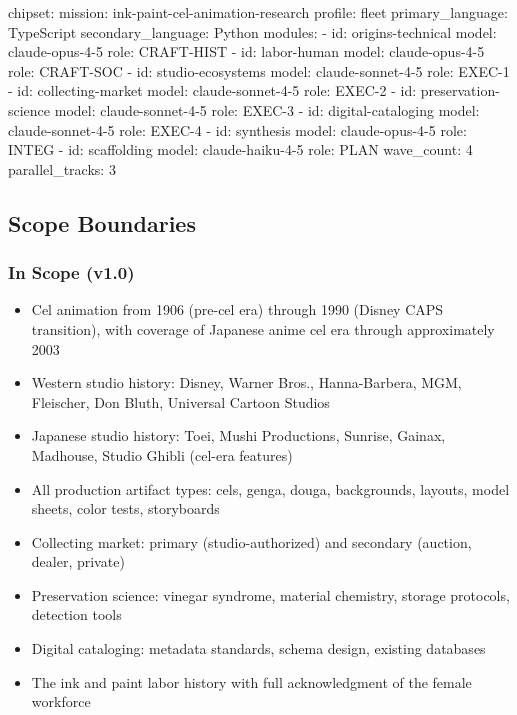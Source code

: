 \documentclass[11pt,letterpaper]{article}
\begin{document}
\begin{asciibox}
chipset:
  mission: ink-paint-cel-animation-research
  profile: fleet
  primary_language: TypeScript
  secondary_language: Python
  modules:
    - id: origins-technical
      model: claude-opus-4-5
      role: CRAFT-HIST
    - id: labor-human
      model: claude-opus-4-5
      role: CRAFT-SOC
    - id: studio-ecosystems
      model: claude-sonnet-4-5
      role: EXEC-1
    - id: collecting-market
      model: claude-sonnet-4-5
      role: EXEC-2
    - id: preservation-science
      model: claude-sonnet-4-5
      role: EXEC-3
    - id: digital-cataloging
      model: claude-sonnet-4-5
      role: EXEC-4
    - id: synthesis
      model: claude-opus-4-5
      role: INTEG
    - id: scaffolding
      model: claude-haiku-4-5
      role: PLAN
  wave_count: 4
  parallel_tracks: 3
\end{asciibox}

\subsection{Scope Boundaries}

\subsubsection{In Scope (v1.0)}
\begin{itemize}
  \item Cel animation from 1906 (pre-cel era) through 1990 (Disney CAPS transition), with coverage of Japanese anime cel era through approximately 2003
  \item Western studio history: Disney, Warner Bros., Hanna-Barbera, MGM, Fleischer, Don Bluth, Universal Cartoon Studios
  \item Japanese studio history: Toei, Mushi Productions, Sunrise, Gainax, Madhouse, Studio Ghibli (cel-era features)
  \item All production artifact types: cels, genga, douga, backgrounds, layouts, model sheets, color tests, storyboards
  \item Collecting market: primary (studio-authorized) and secondary (auction, dealer, private)
  \item Preservation science: vinegar syndrome, material chemistry, storage protocols, detection tools
  \item Digital cataloging: metadata standards, schema design, existing databases
  \item The ink and paint labor history with full acknowledgment of the female workforce
\end{itemize}
\end{document}
